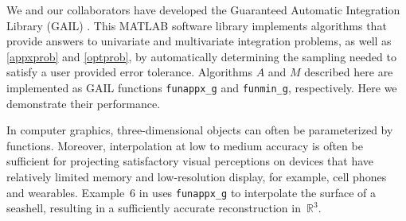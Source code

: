 \documentclass[review]{elsarticle}
\theoremstyle{definition}
\newcommand{\funappxg}{\texttt{funappx\_g}\xspace}
\newcommand{\funming}{\texttt{funmin\_g\xspace}}
\begin{document}
We and our collaborators have developed the Guaranteed Automatic Integration Library (GAIL) \cite{ChoEtal15a}.  This MATLAB software library implements algorithms that provide answers to univariate and multivariate integration problems, as well as \eqref{appxprob} and \eqref{optprob}, by automatically determining the sampling needed to satisfy a user provided error tolerance. Algorithms $A$ and $M$ described here are implemented as GAIL functions  \funappxg{} and \funming, respectively.  Here we demonstrate their performance.

In computer graphics, three-dimensional objects can often be parameterized by
functions. Moreover, interpolation at low to medium accuracy is often
be sufficient for projecting satisfactory visual perceptions on devices that
have relatively limited memory and low-resolution display, for example,
cell phones and wearables. Example~6 in \cite[Chapter~3, Section~6]{Din15a} uses \funappxg{} to
interpolate the surface of a seashell, resulting in a sufficiently accurate
reconstruction in~$\mathbb{R}^3$.
\end{document}

